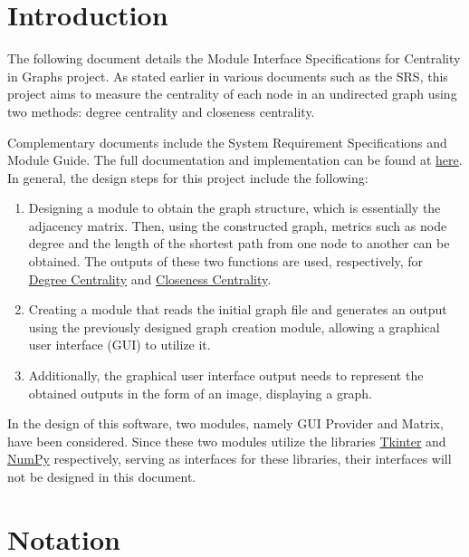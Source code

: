\documentclass[12pt, titlepage]{article}
\begin{document}
\section{Introduction}

The following document details the Module Interface Specifications for Centrality in Graphs project. As stated earlier in various documents such as the SRS, this project aims to measure the centrality of each node in an undirected graph using two methods: degree centrality and closeness centrality.

Complementary documents include the System Requirement Specifications
and Module Guide.  The full documentation and implementation can be
found at \href{https://github.com/AtiyehSayadi/Centrality-In-Graphs/blob/main/docs/ProblemStatementAndGoals/ProblemStatement.pdf}{here}. \\
In general, the design steps for this project include the following:\\
\begin{enumerate}
\item Designing a module to obtain the graph structure, which is essentially the adjacency matrix. Then, using the constructed graph, metrics such as node degree and the length of the shortest path from one node to another can be obtained. The outputs of these two functions are used, respectively, for \href{https://towardsdatascience.com/graph-analytics-introduction-and-concepts-of-centrality-8f5543b55de3}{Degree Centrality} and \href{https://www.geeksforgeeks.org/closeness-centrality-centrality-measure/}{Closeness Centrality}.\\
\item Creating a module that reads the initial graph file and generates an output using the previously designed graph creation module, allowing a graphical user interface (GUI) to utilize it.\\
\item Additionally, the graphical user interface output needs to represent the obtained outputs in the form of an image, displaying a graph.
\end{enumerate}
In the design of this software, two modules, namely GUI Provider and Matrix, have been considered. Since these two modules utilize the libraries \href{https://docs.python.org/3/library/tk.html}{Tkinter} and \href{https://numpy.org/}{NumPy} respectively, serving as interfaces for these libraries, their interfaces will not be designed in this document.

\section{Notation}
\end{document}
